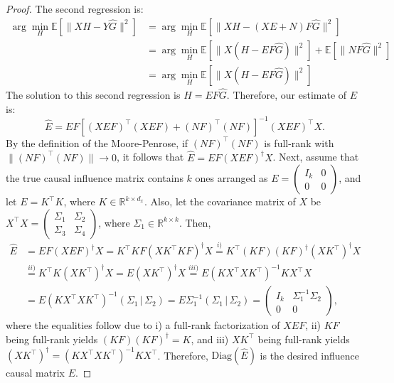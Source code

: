 \documentclass{article}
\begin{document}
\begin{proof}
The second regression is: 
%
\begin{align*}
    \arg \min_H \mathbb{E}[\| XH - Y \hat{G} \|^2] &=\arg  \min_H \mathbb{E}[\| XH - (XE + N)F \hat G \|^2] \\
    &=\arg \min_H \mathbb{E}[\| X(H - EF \hat G) \| ^2] + \mathbb{E}[\| NF\hat G \| ^2]\\
    &= \arg \min_H \mathbb{E}[\| X(H - EF \hat G) \| ^2]
\end{align*}
%
The solution to this second regression is $H = EF\hat{G}$.
%
Therefore, our estimate of $E$ is:
\begin{equation}
    \hat{E} = EF[(XEF)^\top (XEF) + (NF)^\top (NF)]^{-1} (XEF)^\top X.
    \label{eq:estimate}
\end{equation}
%
By the definition of the Moore-Penrose, if $(NF)^\top (NF)$ is full-rank with $\| (NF)^\top (NF) \| \to 0$, it follows that $\hat{E} = EF(XEF)^\dagger X$.
%
Next, assume that the true causal influence matrix contains $k$ ones arranged as $E = \left(\begin{array}{cc} I_k & 0 \\ 0 & 0 \end{array}\right)$, and let $E = K^\top K$, where $K\in \mathbb{R}^{k \times d_x}$.
%
    Also, let the covariance matrix of $X$ be $X^\top X = \left(\begin{array}{cc}\Sigma_{1} & \Sigma_{2} \\ \Sigma_{3} & \Sigma_{4}\end{array}\right)$, where $\Sigma_1 \in \mathbb{R}^{k\times k}$.
%
Then,
\begin{align*}
    \hat{E} &= EF(XEF)^\dagger X = K^\top K F(XK^\top K F)^\dagger X \stackrel{i)}{=} K^\top (K F) (KF)^\dagger (XK^\top)^\dagger X\\
            &\stackrel{ii)}{=} K^\top K(XK^\top)^\dagger X = E (XK^\top)^\dagger X \stackrel{iii)}{=} E (KX^\top X K^\top)^{-1} KX^\top X\\
            &= E (KX^\top X K^\top)^{-1} (\Sigma_1 \,|\, \Sigma_2)  = E \Sigma_1^{-1} (\Sigma_1 \,|\, \Sigma_2)  
            = \left(\begin{array}{cc} I_k & \Sigma_1^{-1} \Sigma_2 \\ 0 & 0 \end{array}\right),
\end{align*}
where the equalities follow due to i) a full-rank factorization of $XEF$, ii) $KF$ being full-rank yields $(KF)(KF)^\dagger = K$, and iii) $X K^\top$ being full-rank yields $(XK^\top)^\dagger = (KX^\top X K^\top)^{-1} KX^\top$.
%
Therefore, $\text{Diag}(\hat{E})$ is the desired influence causal matrix $E$. 
\end{proof}
\end{document}
